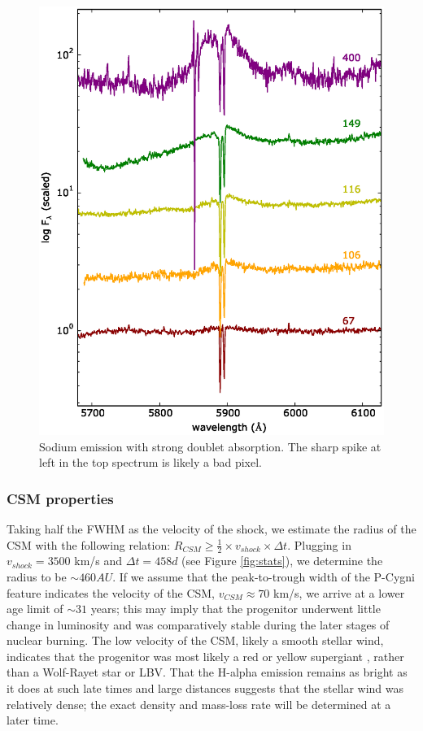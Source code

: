 \documentclass[a4paper,fleqn,usenatbib]{mnras}
\begin{document}
\begin{figure}
  \includegraphics[width=\linewidth]{graphics/sodium.eps}
  \caption{Sodium emission with strong doublet absorption. The sharp spike at left in the top spectrum is likely a bad pixel.}
  \label{fig:sodium}
\end{figure}

\subsubsection{CSM properties} \label{analysis:spec:csm}
Taking half the FWHM as the velocity of the shock, we estimate the radius of the CSM with the following relation: $R_{CSM} \ge \frac{1}{2} \times v_{shock} \times \Delta t$. Plugging in $v_{shock} = 3500$ km/s and $\Delta t = 458 d$ (see Figure \ref{fig:stats}), we determine the radius to be $\sim460 AU$. If we assume that the peak-to-trough width of the P-Cygni feature indicates the velocity of the CSM, $v_{CSM} \approx 70$ km/s, we arrive at a lower age limit of $\sim31$ years; this may imply that the progenitor underwent little change in luminosity and was comparatively stable during the later stages of nuclear burning. The low velocity of the CSM, likely a smooth stellar wind, indicates that the progenitor was most likely a red or yellow supergiant \citep{Smi15}, rather than a Wolf-Rayet star or LBV. That the H-alpha emission remains as bright as it does at such late times and large distances suggests that the stellar wind was relatively dense; the exact density and mass-loss rate will be determined at a later time.
\end{document}

